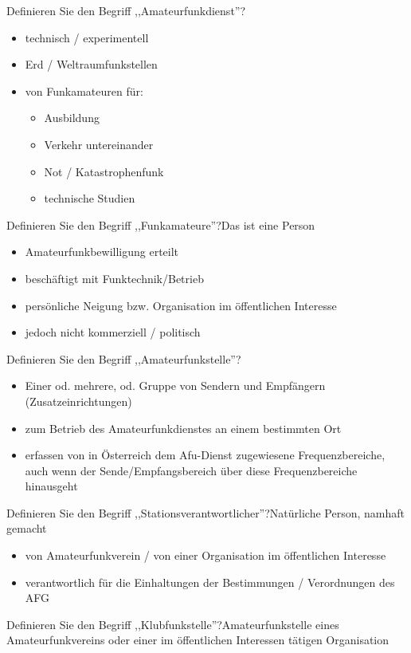 \documentclass[avery5371,grid,frame,a4paper]{flashcards}
\newcommand{\card}[3]{
  \begin{flashcard}[{\chap} -- #1]{#2}#3\end{flashcard}
}
\begin{document}
\card{18}{Definieren Sie den Begriff ,,Amateurfunkdienst''?}{\begin{itemize}\itemsep0pt \item technisch / experimentell \item	Erd / Weltraumfunkstellen \item	von Funkamateuren für: \begin{itemize}\itemsep0pt \item Ausbildung \item Verkehr untereinander \item Not / Katastrophenfunk \item	technische Studien\end{itemize}\end{itemize}}

\card{19}{Definieren Sie den Begriff ,,Funkamateure''?}{Das ist eine Person\begin{itemize}\itemsep0pt \item Amateurfunkbewilligung erteilt \item	beschäftigt mit Funktechnik/Betrieb \item	persönliche Neigung bzw. Organisation im öffentlichen Interesse \item jedoch nicht kommerziell / politisch\end{itemize}}

\card{20}{Definieren Sie den Begriff ,,Amateurfunkstelle''?}{\begin{itemize}\itemsep1pt \item Einer od. mehrere, od. Gruppe von Sendern und Empfängern (Zusatzeinrichtungen) \item	zum Betrieb des Amateurfunkdienstes an einem bestimmten Ort \item	erfassen von in Österreich dem Afu-Dienst zugewiesene Frequenzbereiche, auch wenn	der Sende/Empfangsbereich über diese	Frequenzbereiche hinausgeht\end{itemize}}

\card{21}{Definieren Sie den Begriff ,,Stationsverantwortlicher''?}{Natürliche Person, namhaft gemacht \begin{itemize}\itemsep1pt \item von Amateurfunkverein / von einer Organisation im öffentlichen Interesse \item verantwortlich für die Einhaltungen der Bestimmungen / Verordnungen des AFG\end{itemize}}

\card{22}{Definieren Sie den Begriff ,,Klubfunkstelle''?}{Amateurfunkstelle eines Amateurfunkvereins oder einer im öffentlichen Interessen tätigen Organisation}
\end{document}
